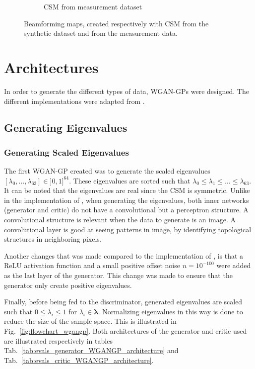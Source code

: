 \documentclass[11pt,a4paper,twoside]{report}
\begin{document}
\begin{figure}
\begin{subfigure}{0.45\textwidth}
        \caption{CSM from measurement dataset}
        \label{fig:datasets_beamforming_example_measurement}
    \end{subfigure}
    \caption{Beamforming maps, created respectively with CSM from the synthetic dataset and from the measurement data.}
    \label{fig:datasets_beamforming_example}
\end{figure}


\section{Architectures}

In order to generate the different types of data, WGAN-GPs were designed. The different implementations were adapted from \cite{nain2020wgangp}.

\subsection{Generating Eigenvalues}

\subsubsection{Generating Scaled Eigenvalues}

The first WGAN-GP created was to generate the scaled eigenvalues $[\lambda_0, \dots, \lambda_{63}] \in ]0,1]^{64}$. These eigenvalues are sorted such that $\lambda_0 \leq \lambda_1 \leq \dots \leq \lambda_{63}$. It can be noted that the eigenvalues are real since the CSM is symmetric. Unlike in the implementation of \cite{nain2020wgangp}, when generating the eigenvalues, both inner networks (generator and critic) do not have a convolutional but a perceptron structure. A convolutional structure is relevant when the data to generate is an image. A convolutional layer is good at seeing patterns in image, by identifying topological structures in neighboring pixels.

Another changes that was made compared to the implementation of \cite{nain2020wgangp}, is that a ReLU activation function and a small positive offset noise $n = 10^{-100}$ were added as the last layer of the generator. This change was made to ensure that the generator only create positive eigenvalues. 

Finally, before being fed to the discriminator, generated eigenvalues are scaled such that $0 \leq \lambda_i \leq 1$ for $\lambda_i \in \mathbf{\lambda}$. Normalizing eigenvalues in this way is done to reduce the size of the sample space. This is illustrated in Fig.~\ref{fig:flowchart_wgangp}. Both architectures of the generator and critic used are illustrated respectively in tables Tab.~\ref{tab:evals_generator_WGANGP_architecture} and Tab.~\ref{tab:evals_critic_WGANGP_architecture}.
\end{document}
